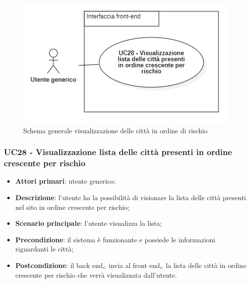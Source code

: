 \begin{center}
	\begin{figure}[H]
		\centering\includegraphics[scale=0.7]{../immagini/attori_casi/UC_28.png}
		\caption{Schema generale visualizzazione delle città in ordine di rischio}
	\end{figure}
\end{center}

\subsubsection{UC28 - Visualizzazione lista delle città presenti in ordine crescente per rischio}\label{CasiDUsoCasiDUsoFacoltativiTraUnUtenteEIlFrontEndElencoCasiDUsoUC18VisualizzazioneListaDelleCittaPresentiInOrdineCrescentePerRischio}


\begin{itemize}
	\item \textbf{Attori primari}: utente generico;
	\item \textbf{Descrizione}: l'utente ha la possibilità di visionare la lista delle città presenti nel sito in ordine crescente per rischio;
	\item \textbf{Scenario principale}: l'utente visualizza la lista;
	\item \textbf{Precondizione}:  il sistema è funzionante e possiede le informazioni riguardanti le città;
	\item \textbf{Postcondizione}: il back end$_{\scaleto{G}{3pt}}$ invia al front end$_{\scaleto{G}{3pt}}$ la lista delle città in ordine crescente per rischio che verrà visualizzata dall'utente.
\end{itemize}
